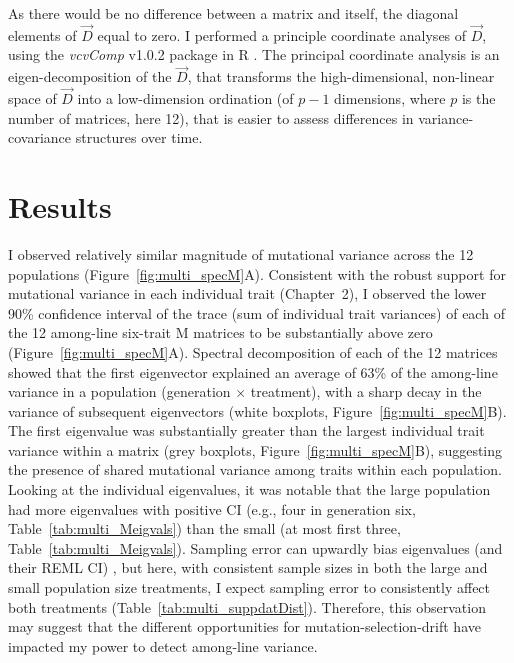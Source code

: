 \noindent As there would be no difference between a matrix and itself, the diagonal elements of $\vec{D}$ equal to zero. I performed a principle coordinate analyses of $\vec{D}$, using the \textit{vcvComp} v1.0.2 package in R \citep{LeMa19}. The principal coordinate analysis is an eigen-decomposition of the $\vec{D}$, that transforms the high-dimensional, non-linear space of $\vec{D}$ into a low-dimension ordination (of $p-1$ dimensions, where $p$ is the number of matrices, here 12), that is easier to assess differences in variance-covariance structures over time. \par


\section{Results}

I observed relatively similar magnitude of mutational variance across the 12 populations (Figure~\ref{fig:multi_specM}A). Consistent with the robust support for mutational variance in each individual trait (Chapter~2), I observed the lower 90\% confidence interval of the trace (sum of individual trait variances) of each of the 12 among-line six-trait M matrices to be substantially above zero (Figure~\ref{fig:multi_specM}A). Spectral decomposition of each of the 12 matrices showed that the first eigenvector explained an average of 63\% of the among-line variance in a population (generation $\times$ treatment), with a sharp decay in the variance of subsequent eigenvectors (white boxplots, Figure~\ref{fig:multi_specM}B). The first eigenvalue was substantially greater than the largest individual trait variance within a matrix (grey boxplots, Figure~\ref{fig:multi_specM}B), suggesting the presence of shared mutational variance among traits within each population. Looking at the individual eigenvalues, it was notable that the large population had more eigenvalues with positive CI (e.g., four in generation six, Table~\ref{tab:multi_Meigvals}) than the small (at most first three, Table~\ref{tab:multi_Meigvals}). Sampling error can upwardly bias eigenvalues (and their REML CI) \citep{Szte17a}, but here, with consistent sample sizes in both the large and small population size treatments, I expect sampling error to consistently affect both treatments (Table~\ref{tab:multi_suppdatDist}). Therefore, this observation may suggest that the different opportunities for mutation-selection-drift have impacted my power to detect among-line variance. \par

